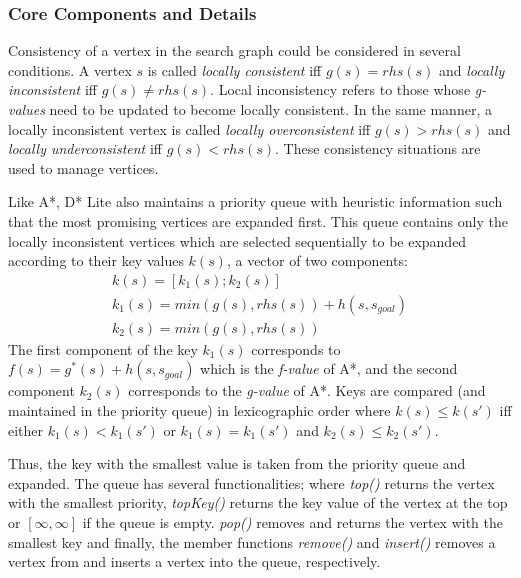 \documentclass[10pt,journal]{IEEEtran}
\begin{document}
\subsubsection{Core Components and Details}

Consistency of a vertex in the search graph could be considered in several conditions. A vertex $s$ is called \textit{locally consistent} iff $g(s) = rhs(s)$ and \textit{locally inconsistent} iff $g(s) \neq rhs(s)$. Local inconsistency refers to those whose \textit{g-values} need to be updated to become locally consistent. In the same manner, a locally inconsistent vertex is called \textit{locally overconsistent} iff $g(s) > rhs(s)$ and \textit{locally underconsistent} iff $g(s) < rhs(s)$. These consistency situations are used to manage vertices.

Like A*, D* Lite also maintains a priority queue with heuristic information such that the most promising vertices are expanded first. This queue contains only the locally inconsistent vertices which are selected sequentially to be expanded according to their key values $k(s)$, a vector of two components:
\begin{gather*}
k(s) = [k_{1}(s); k_{2}(s)] \\
k_{1}(s) = min(g(s), rhs(s)) + h(s, s_{goal}) \\
k_{2}(s) = min(g(s), rhs(s))
\end{gather*}
The first component of the key $k_{1}(s)$ corresponds to $f(s) = g^*(s) + h(s, s_{goal})$ which is the \textit{f-value} of A*, and the second component $k_{2}(s)$ corresponds to the \textit{g-value} of A*. Keys are compared (and maintained in the priority queue) in lexicographic order where $k(s) \leq k(s')$ iff either $k_{1}(s) < k_{1}(s')$ or $k_{1}(s) = k_{1}(s')$ and $k_{2}(s) \leq k_{2}(s')$.

Thus, the key with the smallest value is taken from the priority queue and expanded. The queue has several functionalities; where \textit{top()} returns the vertex with the smallest priority, \textit{topKey()} returns the key value of the vertex at the top or $[\infty, \infty]$ if the queue is empty. \textit{pop()} removes and returns the vertex with the smallest key and finally, the member functions \textit{remove()} and \textit{insert()} removes a vertex from and inserts a vertex into the queue, respectively.
\end{document}
